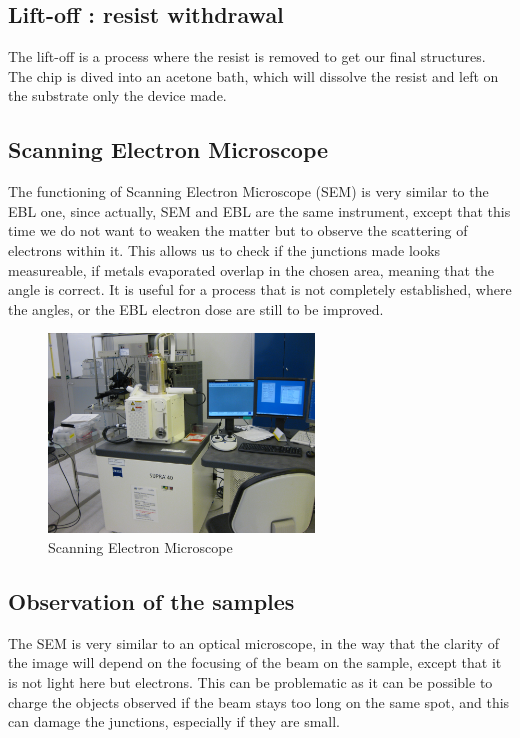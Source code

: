         \subsection{Lift-off : resist withdrawal}
        \label{lift-off}
        
            The lift-off is a process where the resist is removed to get our final structures. The chip is dived into an acetone bath, which will dissolve the resist and left on the substrate only the device made.
            
        \subsection{Scanning Electron Microscope}
            The functioning of Scanning Electron Microscope (SEM) is very similar to the EBL one, since actually, SEM and EBL are the same instrument, except that this time we do not want to weaken the matter but to observe the scattering of electrons within it. This allows us to check if the junctions made looks measureable, if metals evaporated overlap in the chosen area, meaning that the angle is correct. It is useful for a process that is not completely established, where the angles, or the EBL electron dose are still to be improved.
            
            \begin{figure}
                \centering
                \includegraphics[width=200pt]{SEM.JPG}
                \caption{Scanning Electron Microscope}
            \end{figure}
            
        \subsection{Observation of the samples}
            The SEM is very similar to an optical microscope, in the way that the clarity of the image will depend on the focusing of the beam on the sample, except that it is not light here but electrons. This can be problematic as it can be possible to charge the objects observed if the beam stays too long on the same spot, and this can damage the junctions, especially if they are small.
            
